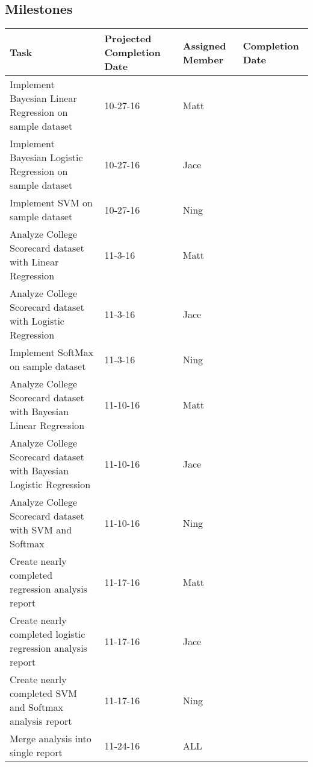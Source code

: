 \documentclass[10pt]{article}
\begin{document}
\begin{appendices}
  \section{Milestones}
  
  \begin{center}
\begin{tabular}{| P{5.5cm} | P{2cm} | P{1.5cm} | P{2cm} |}
 \hline Task & Projected Completion Date & Assigned Member & Completion Date \\ 
 \hline Implement Bayesian Linear Regression on sample dataset & 10-27-16 & Matt & \\  
 \hline Implement Bayesian Logistic Regression on sample dataset & 10-27-16 & Jace & \\
 \hline Implement SVM on sample dataset & 10-27-16 & Ning & \\
 \hline Analyze College Scorecard dataset with Linear Regression & 11-3-16 & Matt & \\
 \hline Analyze College Scorecard dataset with Logistic Regression & 11-3-16 & Jace & \\
  \hline Implement SoftMax on sample dataset & 11-3-16 & Ning & \\
 \hline Analyze College Scorecard dataset with Bayesian Linear Regression & 11-10-16 & Matt & \\
 \hline Analyze College Scorecard dataset with Bayesian Logistic Regression & 11-10-16 & Jace & \\
  \hline Analyze College Scorecard dataset with SVM and Softmax & 11-10-16 & Ning & \\
 \hline Create nearly completed regression analysis report & 11-17-16 & Matt & \\
 \hline Create nearly completed logistic regression analysis report & 11-17-16 & Jace & \\
 \hline Create nearly completed SVM and Softmax analysis report & 11-17-16 & Ning & \\
 \hline Merge analysis into single report & 11-24-16 & ALL & \\
 \hline
\end{tabular}
\end{center}
  
\end{appendices}
\end{document}
